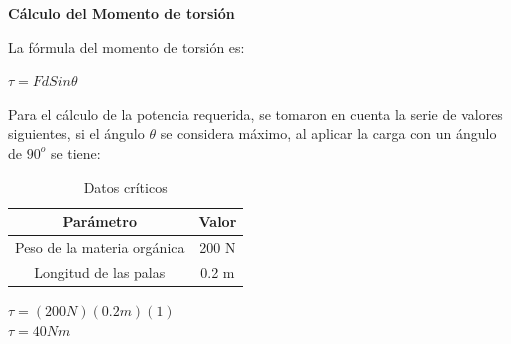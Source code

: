 \textbf{Cálculo del Momento de torsión }

La fórmula del momento de torsión es:

\begin{center}
    $\tau=FdSin\theta$
\end{center}

Para el cálculo de la potencia requerida, se tomaron en cuenta la serie de valores siguientes, si el ángulo $\theta$ se considera máximo, al aplicar la carga con un ángulo de $90 ^o$ se tiene:

\begin{table}[h]
    \centering
    \caption{Datos críticos}
    \begin{tabular}{|c|c|}
        Parámetro & Valor \\
        \hline
        Peso de la materia orgánica & 200 N \\
        Longitud de las palas & 0.2 m 
    \end{tabular}
    \label{tab:DatosTor}
\end{table}

\begin{center}
    $\tau=(200 N)(0.2 m)(1)$ \\
    $\tau=40 Nm $
\end{center}

